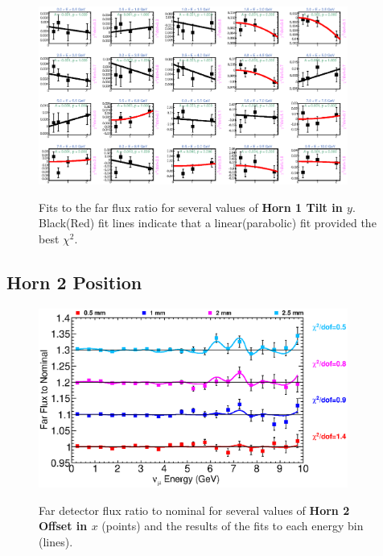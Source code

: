 \begin{figure}[hb]
  \begin{center}
    {\includegraphics[width=4.0in]{figures/Horn1YTilt_far_fits.eps}}
  \end{center}
\caption{ Fits to the far flux ratio for several values of {\bf Horn 1 Tilt in $y$}. Black(Red) fit lines indicate that a linear(parabolic) fit provided the best $\chi^2$. }
\end{figure}

\clearpage
\subsection{Horn 2 Position}

\begin{figure}[ht]
  \begin{center}
    {\includegraphics[width=4.0in]{figures/Horn2XOffset_far_summary.eps}}
  \end{center}
\caption{ Far detector flux ratio to nominal for several values of {\bf Horn 2 Offset in $x$} (points) and the results of the fits to each energy bin (lines).}
\end{figure}

